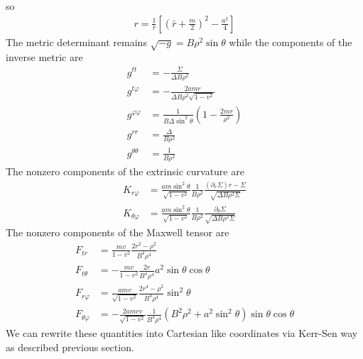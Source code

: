 \documentclass[prd]{revtex4}
\begin{document}
so
\begin{align}
r = \frac{1}{\bar{r}} \left[ \left(\bar{r} + \frac{m}{2} \right)^2 - \frac{a^2}{4} \right]
\end{align}
The metric determinant remains $\sqrt{-g} = B \rho^2 \sin \theta$ while the components of the inverse metric are
\begin{align}
g^{tt} &= - \frac{\Sigma}{\Delta B \rho^2} \\
g^{t \varphi} &= - \frac{2 a m r}{\Delta B \rho^2 \sqrt{1-v^2}} \\
g^{\varphi \varphi} &= \frac{1}{B \Delta \sin^2 \theta} \left(1-\frac{2mr}{\rho^2} \right) \\
g^{rr} &= \frac{\Delta}{B \rho^2} \\
g^{\theta \theta} &= \frac{1}{B \rho^2}
\end{align}
The nonzero components of the extrinsic curvature are
\begin{align}
K_{r \varphi} &= \frac{a m \sin^2 \theta}{\sqrt{1-v^2}} \frac{1}{B \rho^2} \frac{(\partial_r \Sigma) r - \Sigma}{\sqrt{\Delta B \rho^2 \Sigma}} \\
K_{\theta \varphi} &= \frac{a m \sin^2 \theta}{\sqrt{1-v^2}} \frac{1}{B \rho^2} \frac{\partial_\theta \Sigma }{\sqrt{\Delta B \rho^2 \Sigma}} 
\end{align}
The nonzero components of the Maxwell tensor are
\begin{align}
F_{tr} &= \frac{mv}{1-v^2} \frac{2r^2 - \rho^2}{B^4 \rho^4} \\
F_{t \theta} &= - \frac{mv}{1-v^2} \frac{2r}{B^4 \rho^4} a^2 \sin \theta \cos \theta \\
F_{r \varphi} &= \frac{amv}{\sqrt{1-v^2}} \frac{2r^4 - \rho^2}{B^4 \rho^4} \sin^2 \theta \\
F_{\theta \varphi} &= -\frac{2amrv}{\sqrt{1-v^2}} \frac{1}{B^4 \rho^4} (B^2 \rho^2 + a^2 \sin^2 \theta) \sin \theta \cos \theta
\end{align}
We can rewrite these quantities into Cartesian like coordinates via Kerr-Sen way as described previous section.
\end{document}

